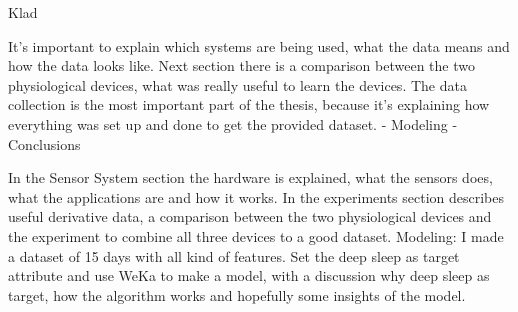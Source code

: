 		Klad		


		It's important to explain which systems are being used, what the data means and how the data looks like. Next section there is a comparison between the two physiological devices, what was really useful to learn the devices. The data collection is the most important part of the thesis, because it's explaining how everything was set up and done to get the provided dataset. - Modeling - Conclusions 

		In the Sensor System section the hardware is explained, what the sensors does, what the applications are and how it works. 
		In the experiments section describes useful derivative data, a comparison between the two physiological devices and the experiment to combine all three devices to a good dataset.
		Modeling: I made a dataset of 15 days with all kind of features. Set the deep sleep as target attribute and use WeKa to make a model, with a discussion why deep sleep as target, how the algorithm works and hopefully some insights of the model. 

